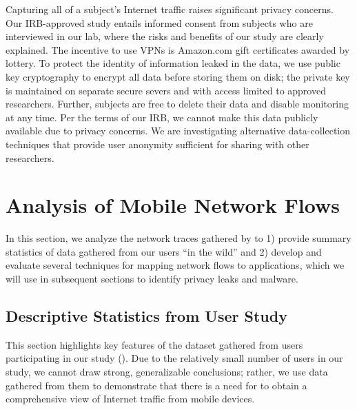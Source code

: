 Capturing all of a subject's Internet traffic raises significant
privacy concerns.  Our IRB-approved study entails informed consent
from subjects who are interviewed in our lab, where the risks and
benefits of our study are clearly explained.  The incentive to use
VPNs is Amazon.com gift certificates awarded by lottery. To protect the
identity of information leaked in the data, we use public key
cryptography to encrypt all data before storing them 
on disk; the private key is
maintained on separate secure severs and with access limited to
approved researchers.  Further, subjects are free to delete their
data and disable monitoring at any time.  Per the terms of our IRB, we cannot 
make this data publicly available due to privacy concerns. We are investigating 
alternative data-collection techniques that provide user anonymity sufficient 
for sharing with other researchers.

\section{Analysis of Mobile Network Flows}
In this section, we analyze the network traces gathered by \meddle to 
1) provide summary statistics of data gathered from our 
users ``in the wild'' and
2) develop and evaluate several techniques for mapping network flows to 
applications, which we will use in subsequent sections to identify privacy 
leaks and malware.


\subsection{Descriptive Statistics from User Study}

This section highlights key features of the dataset gathered from 
users participating in our study (\mobWild). 
Due to the relatively small number of users in our study, we cannot 
draw strong, generalizable conclusions; rather, we use data gathered 
from them to demonstrate that there is a need for \platname{} to 
obtain a comprehensive view of Internet traffic from mobile devices. 

